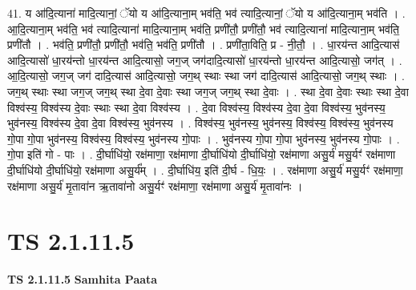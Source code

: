 \documentclass[17pt]{extarticle}
\begin{document}
41. य आ॑दि॒त्याना॑ मादि॒त्यानां॒ ॅयो य आ॑दि॒त्याना॒म् भव॑ति॒ भव॑ त्यादि॒त्यानां॒ ॅयो य आ॑दि॒त्याना॒म् भव॑ति । . आ॒दि॒त्याना॒म् भव॑ति॒ भव॑ त्यादि॒त्याना॑ मादि॒त्याना॒म् भव॑ति॒ प्रणी॑तौ॒ प्रणी॑तौ॒ भव॑ त्यादि॒त्याना॑ मादि॒त्याना॒म् भव॑ति॒ प्रणी॑तौ । . भव॑ति॒ प्रणी॑तौ॒ प्रणी॑तौ॒ भव॑ति॒ भव॑ति॒ प्रणी॑तौ । . प्रणी॑ता॒विति॒ प्र - नी॒तौ॒ । . धा॒रय॑न्त आदि॒त्यास॑ आदि॒त्यासो॑ धा॒रय॑न्तो धा॒रय॑न्त आदि॒त्यासो॒ जग॒ज् जग॑दादि॒त्यासो॑ धा॒रय॑न्तो धा॒रय॑न्त आदि॒त्यासो॒ जग॑त् । . आ॒दि॒त्यासो॒ जग॒ज् जग॑ दादि॒त्यास॑ आदि॒त्यासो॒ जग॒थ् स्थाः स्था जग॑ दादि॒त्यास॑ आदि॒त्यासो॒ जग॒थ् स्थाः । . जग॒थ् स्थाः स्था जग॒ज् जग॒थ् स्था दे॒वा दे॒वाः स्था जग॒ज् जग॒थ् स्था दे॒वाः । . स्था दे॒वा दे॒वाः स्थाः स्था दे॒वा विश्व॑स्य॒ विश्व॑स्य दे॒वाः स्थाः स्था दे॒वा विश्व॑स्य । . दे॒वा विश्व॑स्य॒ विश्व॑स्य दे॒वा दे॒वा विश्व॑स्य॒ भुव॑नस्य॒ भुव॑नस्य॒ विश्व॑स्य दे॒वा दे॒वा विश्व॑स्य॒ भुव॑नस्य । . विश्व॑स्य॒ भुव॑नस्य॒ भुव॑नस्य॒ विश्व॑स्य॒ विश्व॑स्य॒ भुव॑नस्य गो॒पा गो॒पा भुव॑नस्य॒ विश्व॑स्य॒ विश्व॑स्य॒ भुव॑नस्य गो॒पाः । . भुव॑नस्य गो॒पा गो॒पा भुव॑नस्य॒ भुव॑नस्य गो॒पाः । . गो॒पा इति॑ गो - पाः । . दी॒र्घाधि॑यो॒ रक्ष॑माणा॒ रक्ष॑माणा दी॒र्घाधि॑यो दी॒र्घाधि॑यो॒ रक्ष॑माणा असु॒र्य॑ मसु॒र्यꣳ॑ रक्ष॑माणा दी॒र्घाधि॑यो दी॒र्घाधि॑यो॒ रक्ष॑माणा असु॒र्य᳚म् । . दी॒र्घाधि॑य॒ इति॑ दी॒र्घ - धि॒यः॒ । . रक्ष॑माणा असु॒र्य॑ मसु॒र्यꣳ॑ रक्ष॑माणा॒ रक्ष॑माणा असु॒र्य॑ मृ॒तावा॑न ऋ॒तावा॑नो असु॒र्यꣳ॑ रक्ष॑माणा॒ रक्ष॑माणा असु॒र्य॑ मृ॒तावा॑नः । \newline
\pagebreak
{}

\section{ TS 2.1.11.5 }

\textbf{TS 2.1.11.5 } \newline
\textbf{Samhita Paata} \newline
\end{document}
